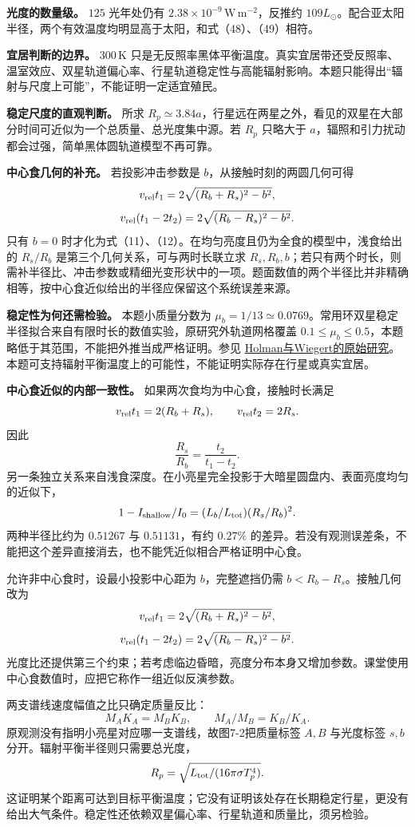 \documentclass[12pt,a4paper,UTF8]{ctexart}
\begin{document}
\textbf{光度的数量级。} \(125\) 光年处仍有
\(2.38\times10^{-9}\,\mathrm{W\,m^{-2}}\)，反推约
\(109L_\odot\)。配合亚太阳半径，两个有效温度均明显高于太阳，和式（48）、（49）相符。

\textbf{宜居判断的边界。} \(300\,\mathrm K\)
只是无反照率黑体平衡温度。真实宜居带还受反照率、温室效应、双星轨道偏心率、行星轨道稳定性与高能辐射影响。本题只能得出``辐射与尺度上可能''，不能证明一定适宜殖民。

\textbf{稳定尺度的直观判断。} 所求
\(R_p\simeq3.84a\)，行星远在两星之外，看见的双星在大部分时间可近似为一个总质量、总光度集中源。若
\(R_p\) 只略大于
\(a\)，辐照和引力扰动都会过强，简单黑体圆轨道模型不再可靠。

\textbf{中心食几何的补充。} 若投影冲击参数是
\(b\)，从接触时刻的两圆几何可得 \[
v_{\rm rel}t_1=2\sqrt{(R_b+R_s)^2-b^2},
\] \[
v_{\rm rel}(t_1-2t_2)=2\sqrt{(R_b-R_s)^2-b^2}.
\] 只有 \(b=0\)
时才化为式（11）、（12）。在均匀亮度且仍为全食的模型中，浅食给出的
\(R_s/R_b\) 是第三个几何关系，可与两时长联立求
\(R_s,R_b,b\)；若只有两个时长，则需补半径比、冲击参数或精细光变形状中的一项。题面数值的两个半径比并非精确相等，按中心食近似给出的半径应保留这个系统误差来源。

\textbf{稳定性为何还需检验。} 本题小质量分数为
\(\mu_b=1/13\simeq0.0769\)。常用环双星稳定半径拟合来自有限时长的数值实验，原研究外轨道网格覆盖
\(0.1\le\mu_b\le0.5\)，本题略低于其范围，不能把外推当成严格证明。参见
\href{https://arxiv.org/abs/astro-ph/9809315}{Holman与Wiegert的原始研究}。本题可支持辐射平衡温度上的可能性，不能证明实际存在行星或真实宜居。

\textbf{中心食近似的内部一致性。} 如果两次食均为中心食，接触时长满足 \[
v_{\rm rel}t_1=2(R_b+R_s),\qquad
v_{\rm rel}t_2=2R_s.
\] 因此 \[
\frac{R_s}{R_b}=\frac{t_2}{t_1-t_2}.
\]
另一条独立关系来自浅食深度。在小亮星完全投影于大暗星圆盘内、表面亮度均匀的近似下，
\[
1-I_{\rm shallow}/I_0=(L_b/L_{\rm tot})(R_s/R_b)^2.
\] 两种半径比约为 \(0.51267\) 与 \(0.51131\)，有约 \(0.27\%\)
的差异。若没有观测误差条，不能把这个差异直接消去，也不能凭近似相合严格证明中心食。

允许非中心食时，设最小投影中心距为 \(b\)，完整遮挡仍需
\(b<R_b-R_s\)。接触几何改为 \[
v_{\rm rel}t_1=2\sqrt{(R_b+R_s)^2-b^2},
\] \[
v_{\rm rel}(t_1-2t_2)=2\sqrt{(R_b-R_s)^2-b^2}.
\]
光度比还提供第三个约束；若考虑临边昏暗，亮度分布本身又增加参数。课堂使用中心食数值时，应把它称作一组近似反演参数。

两支谱线速度幅值之比只确定质量反比： \[
M_AK_A=M_BK_B,\qquad M_A/M_B=K_B/K_A.
\] 原观测没有指明小亮星对应哪一支谱线，故图7-2把质量标签 \(A,B\)
与光度标签 \(s,b\) 分开。辐射平衡半径则只需要总光度， \[
R_p=\sqrt{L_{\rm tot}/(16\pi\sigma T_p^4)}.
\]
这证明某个距离可达到目标平衡温度；它没有证明该处存在长期稳定行星，更没有给出大气条件。稳定性还依赖双星偏心率、行星轨道和质量比，须另检验。
\end{document}
